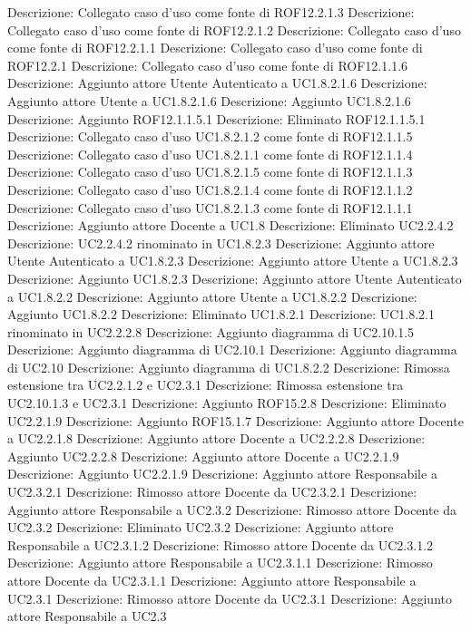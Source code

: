 Descrizione: Collegato caso d'uso  come fonte di ROF12.2.1.3 
Descrizione: Collegato caso d'uso  come fonte di ROF12.2.1.2 
Descrizione: Collegato caso d'uso come fonte di ROF12.2.1.1 
Descrizione: Collegato caso d'uso come fonte di ROF12.2.1 
Descrizione: Collegato caso d'uso come fonte di ROF12.1.1.6 
Descrizione: Aggiunto attore Utente Autenticato a UC1.8.2.1.6 
Descrizione: Aggiunto attore Utente a UC1.8.2.1.6 
Descrizione: Aggiunto UC1.8.2.1.6 
Descrizione: Aggiunto ROF12.1.1.5.1 
Descrizione: Eliminato ROF12.1.1.5.1 
Descrizione: Collegato caso d'uso UC1.8.2.1.2 come fonte di ROF12.1.1.5 
Descrizione: Collegato caso d'uso UC1.8.2.1.1 come fonte di ROF12.1.1.4 
Descrizione: Collegato caso d'uso UC1.8.2.1.5 come fonte di ROF12.1.1.3 
Descrizione: Collegato caso d'uso UC1.8.2.1.4 come fonte di ROF12.1.1.2 
Descrizione: Collegato caso d'uso UC1.8.2.1.3 come fonte di ROF12.1.1.1 
Descrizione: Aggiunto attore Docente a UC1.8 
Descrizione: Eliminato UC2.2.4.2 
Descrizione: UC2.2.4.2 rinominato in UC1.8.2.3 
Descrizione: Aggiunto attore Utente Autenticato a UC1.8.2.3 
Descrizione: Aggiunto attore Utente a UC1.8.2.3 
Descrizione: Aggiunto UC1.8.2.3 
Descrizione: Aggiunto attore Utente Autenticato a UC1.8.2.2 
Descrizione: Aggiunto attore Utente a UC1.8.2.2 
Descrizione: Aggiunto UC1.8.2.2 
Descrizione: Eliminato UC1.8.2.1 
Descrizione: UC1.8.2.1 rinominato in UC2.2.2.8 
Descrizione: Aggiunto diagramma di UC2.10.1.5 
Descrizione: Aggiunto diagramma di UC2.10.1 
Descrizione: Aggiunto diagramma di UC2.10 
Descrizione: Aggiunto diagramma di UC1.8.2.2 
Descrizione: Rimossa estensione tra UC2.2.1.2 e UC2.3.1 
Descrizione: Rimossa estensione tra UC2.10.1.3 e UC2.3.1 
Descrizione: Aggiunto ROF15.2.8 
Descrizione: Eliminato UC2.2.1.9 
Descrizione: Aggiunto ROF15.1.7 
Descrizione: Aggiunto attore Docente a UC2.2.1.8 
Descrizione: Aggiunto attore Docente a UC2.2.2.8 
Descrizione: Aggiunto UC2.2.2.8 
Descrizione: Aggiunto attore Docente a UC2.2.1.9 
Descrizione: Aggiunto UC2.2.1.9 
Descrizione: Aggiunto attore Responsabile a UC2.3.2.1 
Descrizione: Rimosso attore Docente da UC2.3.2.1 
Descrizione: Aggiunto attore Responsabile a UC2.3.2 
Descrizione: Rimosso attore Docente da UC2.3.2 
Descrizione: Eliminato UC2.3.2 
Descrizione: Aggiunto attore Responsabile a UC2.3.1.2 
Descrizione: Rimosso attore Docente da UC2.3.1.2 
Descrizione: Aggiunto attore Responsabile a UC2.3.1.1 
Descrizione: Rimosso attore Docente da UC2.3.1.1 
Descrizione: Aggiunto attore Responsabile a UC2.3.1 
Descrizione: Rimosso attore Docente da UC2.3.1 
Descrizione: Aggiunto attore Responsabile a UC2.3 
